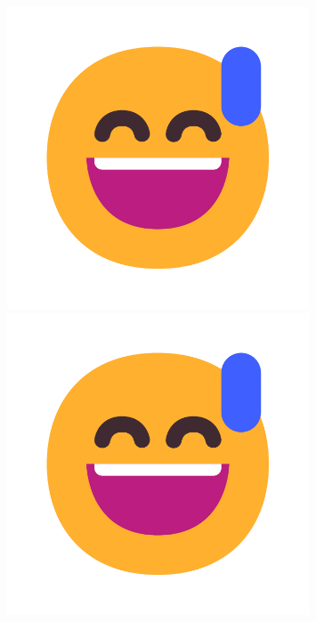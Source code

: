 \documentclass[letterpaper]{article}
\begin{document}
\begin{figure}
    \centering
    \begin{minipage}[b]{0.3\textwidth}
        \centering
        \includegraphics[width=0.8\textwidth]{assets/example.pdf}
        \includegraphics[width=0.8\textwidth]{assets/example.pdf}
    \end{minipage}
    \begin{minipage}[b]{0.3\textwidth}
        \centering

\end{minipage}
\end{figure}
\end{document}
